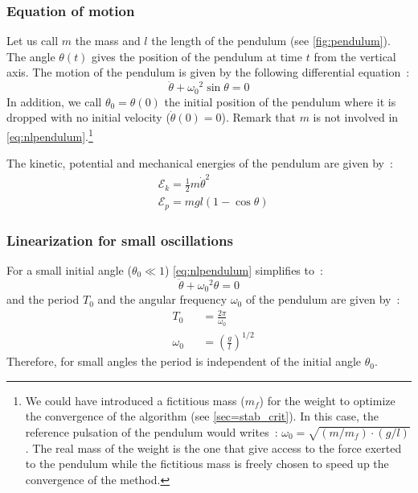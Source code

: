 \subsubsection{Equation of motion}
Let us call $m$ the mass and $l$ the length of the pendulum (see \cref{fig:pendulum}). The angle $\theta(t)$ gives the position of the pendulum at time $t$ from the vertical axis. The motion of the pendulum is given by the following differential equation~:
\begin{equation}
	\ddot{\theta} + {\omega_0}^2 \sin{\theta} = 0 \label{eq:nlpendulum}
\end{equation}
In addition, we call $\theta_0 = \theta(0)$ the initial position of the pendulum where it is dropped with no initial velocity ($\dot{\theta}(0) = 0$). Remark that $m$ is not involved in \cref{eq:nlpendulum}.\footnote{We could have introduced a fictitious mass ($m_f$) for the weight to optimize the convergence of the algorithm (see \cref{sec=stab_crit}). In this case, the reference pulsation of the pendulum would writes~: $\omega_0 = \sqrt{(m/m_f)\cdot(g/l)}$. The real mass of the weight is the one that give access to the force exerted to the pendulum while the fictitious mass is freely chosen to speed up the convergence of the method.}

The kinetic, potential and mechanical energies of the pendulum are given by~:
\begin{subequations}
\begin{alignat}{5}
	&\mathcal{E}_k = \frac{1}{2} m \dot{\theta}^2
	\\
	&\mathcal{E}_p =  mgl (1-\cos\theta)
\end{alignat}
\end{subequations}
\subsubsection{Linearization for small oscillations}
For a small initial angle ($\theta_0 \ll 1$) \cref{eq:nlpendulum} simplifies to~:
\begin{equation}
	\ddot{\theta} + {\omega_0}^2 {\theta} = 0 \label{eq:lpendulum}
\end{equation}
and the period $T_0$ and the angular frequency $\omega_0$ of the pendulum are given by~:
\begin{subequations}
\begin{alignat}{5}
	&{T_0} &&= \frac{2\pi}{\omega_0}\\[0.5em]
	&{\omega_0} &&= \left({\frac{g}{l}}\right)^{1/2}
\end{alignat}
\end{subequations}
Therefore, for small angles the period is independent of the initial angle $\theta_0$.

